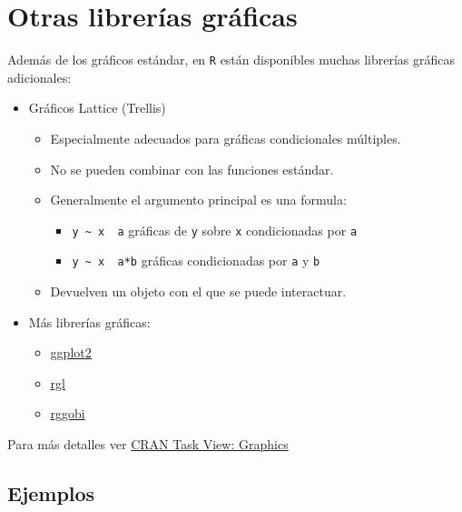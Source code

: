 \documentclass[
]{book}
\theoremstyle{break}
\begin{document}
\hypertarget{otras-libreruxedas-gruxe1ficas}{%
\section{Otras librerías gráficas}\label{otras-libreruxedas-gruxe1ficas}}

Además de los gráficos estándar, en \texttt{R} están disponibles muchas librerías gráficas adicionales:

\begin{itemize}
\item
  Gráficos Lattice (Trellis)

  \begin{itemize}
  \item
    Especialmente adecuados para gráficas condicionales múltiples.
  \item
    No se pueden combinar con las funciones estándar.
  \item
    Generalmente el argumento principal es una formula:

    \begin{itemize}
    \item
      \texttt{y\ \textasciitilde{}\ x\ \textbar{}\ a} gráficas de \texttt{y} sobre \texttt{x} condicionadas por \texttt{a}
    \item
      \texttt{y\ \textasciitilde{}\ x\ \textbar{}\ a*b} gráficas condicionadas por \texttt{a} y \texttt{b}
    \end{itemize}
  \item
    Devuelven un objeto con el que se puede interactuar.
  \end{itemize}
\item
  Más librerías gráficas:

  \begin{itemize}
  \item
    \href{http://had.co.nz/ggplot2}{ggplot2}
  \item
    \href{http://rgl.neoscientists.org}{rgl}
  \item
    \href{http://www.ggobi.org/rggobi}{rggobi}
  \end{itemize}
\end{itemize}

Para más detalles ver \href{http://cran.r-project.org/web/views/Graphics.html}{CRAN Task View: Graphics}

\hypertarget{ejemplos-2}{%
\subsection{Ejemplos}\label{ejemplos-2}}
\end{document}
